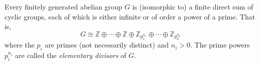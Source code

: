 Every finitely generated abelian group $G$ is (isomorphic to) a finite direct sum of cyclic groups, each of which is either infinite or of order a power of a prime. That is,
$$G \cong \mathbb{Z} \oplus \cdots \oplus \mathbb{Z} \oplus \mathbb{Z}_{p_1^{n_1}} \oplus \cdots \oplus \mathbb{Z}_{p_k^{n_k}}$$
where the $p_i$ are primes (not necessarily distinct) and $n_i > 0$. The prime powers $p_i^{n_i}$ are called the \emph{elementary divisors} of $G$.
